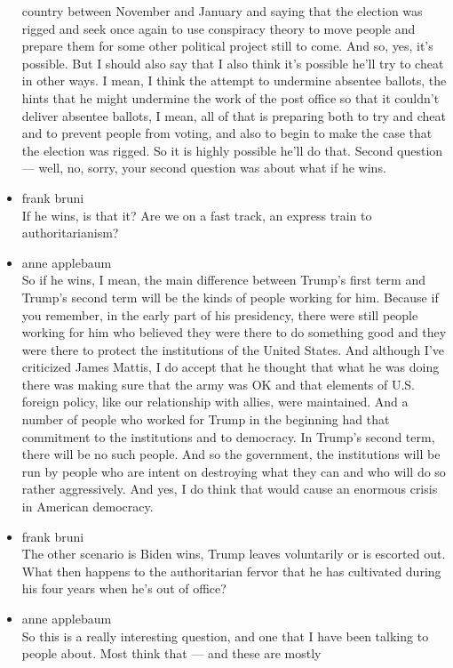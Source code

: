 \begin{itemize}
  country between November and January and saying that the election was
  rigged and seek once again to use conspiracy theory to move people and
  prepare them for some other political project still to come. And so,
  yes, it's possible. But I should also say that I also think it's
  possible he'll try to cheat in other ways. I mean, I think the attempt
  to undermine absentee ballots, the hints that he might undermine the
  work of the post office so that it couldn't deliver absentee ballots,
  I mean, all of that is preparing both to try and cheat and to prevent
  people from voting, and also to begin to make the case that the
  election was rigged. So it is highly possible he'll do that. Second
  question --- well, no, sorry, your second question was about what if
  he wins.
\item
  frank bruni\\
  If he wins, is that it? Are we on a fast track, an express train to
  authoritarianism?
\item
  anne applebaum\\
  So if he wins, I mean, the main difference between Trump's first term
  and Trump's second term will be the kinds of people working for him.
  Because if you remember, in the early part of his presidency, there
  were still people working for him who believed they were there to do
  something good and they were there to protect the institutions of the
  United States. And although I've criticized James Mattis, I do accept
  that he thought that what he was doing there was making sure that the
  army was OK and that elements of U.S. foreign policy, like our
  relationship with allies, were maintained. And a number of people who
  worked for Trump in the beginning had that commitment to the
  institutions and to democracy. In Trump's second term, there will be
  no such people. And so the government, the institutions will be run by
  people who are intent on destroying what they can and who will do so
  rather aggressively. And yes, I do think that would cause an enormous
  crisis in American democracy.
\item
  frank bruni\\
  The other scenario is Biden wins, Trump leaves voluntarily or is
  escorted out. What then happens to the authoritarian fervor that he
  has cultivated during his four years when he's out of office?
\item
  anne applebaum\\
  So this is a really interesting question, and one that I have been
  talking to people about. Most think that --- and these are mostly

\end{itemize}
